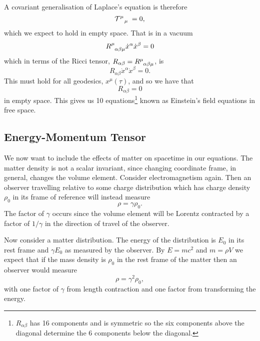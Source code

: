 \documentclass[fleqn]{NotesClass}
\begin{document}
    A covariant generalisation of Laplace's equation is therefore
    \begin{equation}
        \tensor{\mathcal{T}}{^\mu_{\mkern8mu\mu}} = 0,
    \end{equation}
    which we expect to hold in empty space.
    That is in a vacuum
    \begin{equation}
        \tensor{R}{^\mu_{\alpha\beta\mu}}\dot{x}^\alpha\dot{x}^\beta = 0
    \end{equation}
    which in terms of the Ricci tensor, \(R_{\alpha\beta} = \tensor{R}{^\mu_{\smash{\alpha\beta\mu}}}\), is
    \begin{equation}
        R_{\alpha\beta}\dot{x}^\alpha \dot{x}^\beta = 0.
    \end{equation}
    This must hold for all geodesics, \(x^\mu(\tau)\), and so we have that 
    \begin{equation}
        R_{\alpha\beta} = 0
    \end{equation}
    in empty space.
    This gives us 10 equations\footnote{\(R_{\alpha\beta}\) has 16 components and is symmetric so the six components above the diagonal determine the 6 components below the diagonal.} known as Einstein's field equations in free space.
    
    \subsection{Energy-Momentum Tensor}
    We now want to include the effects of matter on spacetime in our equations.
    The matter density is not a scalar invariant, since changing coordinate frame, in general, changes the volume element.
    Consider electromagnetism again.
    Then an observer travelling relative to some charge distribution which has charge density \(\rho_0\) in its frame of reference will instead measure
    \begin{equation}
        \rho = \gamma\rho_0.
    \end{equation}
    The factor of \(\gamma\) occurs since the volume element will be Lorentz contracted by a factor of \(1/\gamma\) in the direction of travel of the observer.
    
    Now consider a matter distribution.
    The energy of the distribution is \(E_0\) in its rest frame and \(\gamma E_0\) as measured by the observer.
    By \(E = mc^2\) and \(m = \rho V\) we expect that if the mass density is \(\rho_0\) in the rest frame of the matter then an observer would measure
    \begin{equation}
        \rho = \gamma^2\rho_0,
    \end{equation}
    with one factor of \(\gamma\) from length contraction and one factor from transforming the energy.
    
\end{document}

